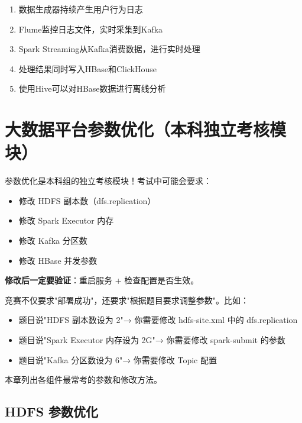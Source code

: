 \documentclass[12pt,a4paper]{article}
\begin{document}
\begin{tipbox}[完整流程总结]
\begin{enumerate}
    \item 数据生成器持续产生用户行为日志
    \item Flume监控日志文件，实时采集到Kafka
    \item Spark Streaming从Kafka消费数据，进行实时处理
    \item 处理结果同时写入HBase和ClickHouse
    \item 使用Hive可以对HBase数据进行离线分析
\end{enumerate}
\end{tipbox}

\section{大数据平台参数优化（本科独立考核模块）}

\begin{warnbox}[重要提醒]
参数优化是本科组的独立考核模块！考试中可能会要求：
\begin{itemize}
    \item 修改 HDFS 副本数（dfs.replication）
    \item 修改 Spark Executor 内存
    \item 修改 Kafka 分区数
    \item 修改 HBase 并发参数
\end{itemize}

\textbf{修改后一定要验证}：重启服务 + 检查配置是否生效。
\end{warnbox}

\begin{knowledgebox}[参数优化是什么意思？]
竞赛不仅要求"部署成功"，还要求"根据题目要求调整参数"。比如：
\begin{itemize}
    \item 题目说"HDFS 副本数设为 2"→ 你需要修改 hdfs-site.xml 中的 dfs.replication
    \item 题目说"Spark Executor 内存设为 2G"→ 你需要修改 spark-submit 的参数
    \item 题目说"Kafka 分区数设为 6"→ 你需要修改 Topic 配置
\end{itemize}

本章列出各组件最常考的参数和修改方法。
\end{knowledgebox}

\subsection{HDFS 参数优化}
\end{document}
